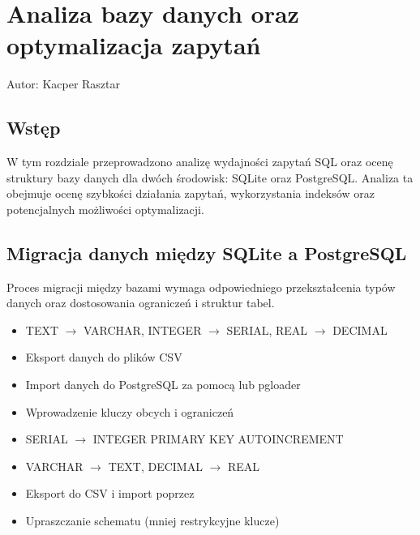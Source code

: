 \documentclass[letterpaper,10pt,english]{sphinxmanual}
\begin{document}
\sphinxstepscope


\chapter{Analiza bazy danych oraz optymalizacja zapytań}
\label{\detokenize{rozdzial4/index:analiza-bazy-danych-oraz-optymalizacja-zapytan}}\label{\detokenize{rozdzial4/index::doc}}
\sphinxAtStartPar
Autor: Kacper Rasztar


\section{Wstęp}
\label{\detokenize{rozdzial4/index:wstep}}
\sphinxAtStartPar
W tym rozdziale przeprowadzono analizę wydajności zapytań SQL oraz ocenę struktury bazy danych dla dwóch środowisk: SQLite oraz PostgreSQL. Analiza ta obejmuje ocenę szybkości działania zapytań, wykorzystania indeksów oraz potencjalnych możliwości optymalizacji.


\section{Migracja danych między SQLite a PostgreSQL}
\label{\detokenize{rozdzial4/index:migracja-danych-miedzy-sqlite-a-postgresql}}
\sphinxAtStartPar
Proces migracji między bazami wymaga odpowiedniego przekształcenia typów danych oraz dostosowania ograniczeń i struktur tabel.

\sphinxAtStartPar
{}
\begin{itemize}
\item {} 
\sphinxAtStartPar
TEXT \(\rightarrow\) VARCHAR, INTEGER \(\rightarrow\) SERIAL, REAL \(\rightarrow\) DECIMAL

\item {} 
\sphinxAtStartPar
Eksport danych do plików CSV

\item {} 
\sphinxAtStartPar
Import danych do PostgreSQL za pomocą  lub pgloader

\item {} 
\sphinxAtStartPar
Wprowadzenie kluczy obcych i ograniczeń

\end{itemize}

\sphinxAtStartPar
{}
\begin{itemize}
\item {} 
\sphinxAtStartPar
SERIAL \(\rightarrow\) INTEGER PRIMARY KEY AUTOINCREMENT

\item {} 
\sphinxAtStartPar
VARCHAR \(\rightarrow\) TEXT, DECIMAL \(\rightarrow\) REAL

\item {} 
\sphinxAtStartPar
Eksport do CSV i import poprzez 

\item {} 
\sphinxAtStartPar
Upraszczanie schematu (mniej restrykcyjne klucze)

\end{itemize}
\end{document}
